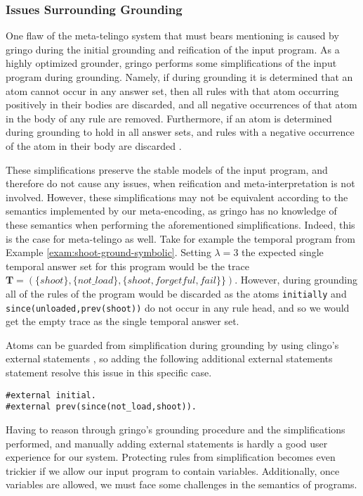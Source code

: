 \subsubsection{Issues Surrounding Grounding}

One flaw of the meta-telingo system that must bears mentioning is
caused by gringo during the initial grounding and reification of the
input program. As a highly optimized grounder, gringo performs some
simplifications of the input program during grounding. Namely, if
during grounding it is determined that an atom cannot occur in any
answer set, then all rules with that atom occurring positively in
their bodies are discarded, and all negative occurrences of that atom
in the body of any rule are removed. Furthermore, if an atom is
determined during grounding to hold in all answer sets, and rules with
a negative occurrence of the atom in their body are discarded
\cite{gekakasc12a}.

These simplifications preserve the stable models of the input program,
and therefore do not cause any issues, when reification and
meta-interpretation is not involved. However, these simplifications
may not be equivalent according to the semantics implemented by our
meta-encoding, as gringo has no knowledge of these semantics when
performing the aforementioned simplifications. Indeed, this is the
case for meta-telingo as well. Take for example the temporal program
from Example \ref{exam:shoot-ground-symbolic}. Setting $\lambda=3$ the
expected single temporal answer set for this program would be the
trace
$\bm{T}=(\{ shoot \}, \{ not\_load \}, \{ shoot, forgetful, fail \}
\})$. However, during grounding all of the rules of the program would
be discarded as the atoms \verb|initially| and
\verb|since(unloaded,prev(shoot))| do not occur in any rule head, and
so we would get the empty trace as the single temporal answer set.

Atoms can be guarded from simplification during grounding by using
clingo's external statements \cite{PotasscoUserGuide19}, so adding the
following additional external statements statement resolve this issue
in this specific case.

\begin{lstlisting}[language=clingo,numbers=none]
#external initial.
#external prev(since(not_load,shoot)).
\end{lstlisting}

Having to reason through gringo's grounding procedure and the
simplifications performed, and manually adding external statements is
hardly a good user experience for our system. Protecting rules from
simplification becomes even trickier if we allow our input program to
contain variables. Additionally, once variables are allowed, we must
face some challenges in the semantics of programs. 

